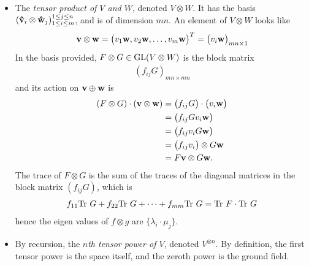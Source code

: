 \begin{itemize}
			\item The \emph{tensor product of $V$ and $W$}, denoted $V \otimes W$.
				\subitem It has the basis $(\mathbf{\hat{v}}_i \otimes \mathbf{\hat{w}}_j)_{1 \leq i \leq m}^{1 \leq j \leq n}$, and is of dimension $mn$.
				\subitem An element of $V \otimes W$ looks like \begin{align*}
					\mathbf{v} \otimes \mathbf{w} = \begin{pmatrix}
						v_1\mathbf{w}, v_2\mathbf{w}, \dots, v_m\mathbf{w}
					\end{pmatrix}^T = \begin{pmatrix}
						v_i\mathbf{w}
					\end{pmatrix}_{mn \times 1} 
				\end{align*}
				\subitem In the basis provided, $F \otimes G \in \text{GL}(V \otimes W)$ is the block matrix 
				\begin{align*}
					(f_{ij}G)_{mn \times mn}
				\end{align*}
				and its action on $\mathbf{v} \oplus \mathbf{w}$ is 
				\begin{align*}
					(F \otimes G ) \cdot (\mathbf{v}  \otimes \mathbf{w}) &= \begin{pmatrix}
						f_{ij}G
					\end{pmatrix}\cdot \begin{pmatrix}
						v_i\mathbf{w}
					\end{pmatrix} \\ 
					&= \begin{pmatrix}
						f_{ij}G v_i \mathbf{w}
					\end{pmatrix} \\ 
					&= \begin{pmatrix}
						f_{ij} v_i G\mathbf{w}
					\end{pmatrix} \\
					&=  \begin{pmatrix}
						f_{ij}v_i
					\end{pmatrix} \otimes G\mathbf{w} \\
					&= F\mathbf{v} \otimes G\mathbf{w}.
				\end{align*}
				\subitem The trace of $F \otimes G$ is the sum of the traces of the diagonal matrices in the block matrix $(f_{ij}G)$, which is 
				\begin{align*}
					f_{11} \text{Tr } G + f_{22} \text{Tr } G + \dots + f_{mm} \text{Tr } G = \text{Tr } F \cdot \text{Tr } G
				\end{align*}
				hence the eigen values of $f \otimes g$ are $\{\lambda_i \cdot \mu_j\}$.
				
			\item By recursion, the \emph{$n$th tensor power of $V$}, denoted $V^{\otimes n}$. By definition, the first tensor power is the space itself, and the zeroth power is the ground field.
			

\end{itemize}
